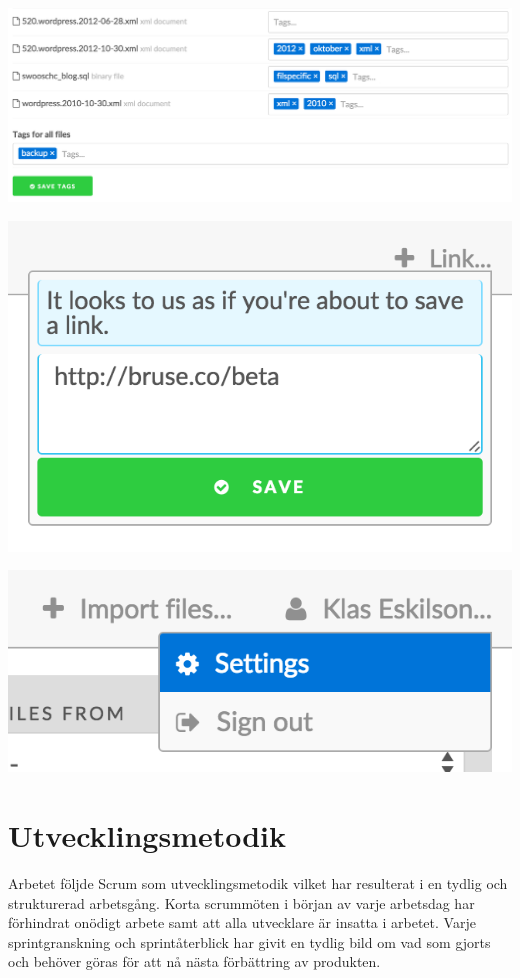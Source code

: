 \begin{Figure}
  \centering
    \includegraphics[width=0.7\linewidth]{figures/screenshots/dump3.png}
\end{Figure}

\begin{Figure}
  \centering
    \includegraphics[width=0.4\linewidth]{figures/screenshots/dump4.png}
\end{Figure}

\begin{Figure}
  \centering
    \includegraphics[width=0.4\linewidth]{figures/screenshots/dump5.png}
\end{Figure}

\section{Utvecklingsmetodik}

Arbetet följde Scrum som utvecklingsmetodik vilket har resulterat i en tydlig
och strukturerad arbetsgång. Korta scrummöten i början av varje arbetsdag har
förhindrat onödigt arbete samt att alla utvecklare är insatta i arbetet. Varje
sprintgranskning och sprintåterblick har givit en tydlig bild om vad som gjorts
och behöver göras för att nå nästa förbättring av produkten.


